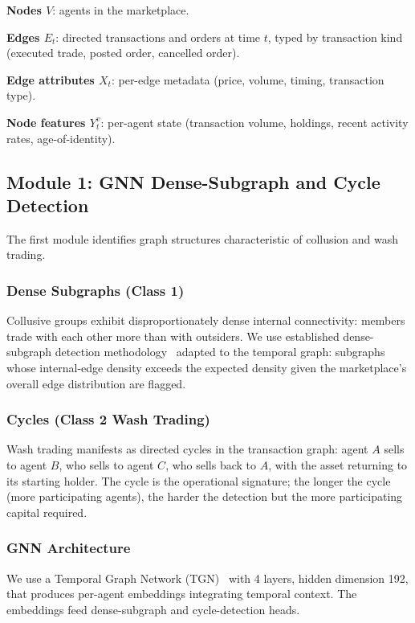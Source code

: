 \documentclass[sigconf,nonacm]{acmart}
\begin{document}
\textbf{Nodes $V$}: agents in the marketplace.

\textbf{Edges $E_t$}: directed transactions and orders at time $t$,
typed by transaction kind (executed trade, posted order, cancelled
order).

\textbf{Edge attributes $X_t$}: per-edge metadata (price, volume,
timing, transaction type).

\textbf{Node features $Y_t^v$}: per-agent state (transaction
volume, holdings, recent activity rates, age-of-identity).

\subsection{Module 1: GNN Dense-Subgraph and Cycle Detection}

The first module identifies graph structures characteristic of
collusion and wash trading.

\subsubsection{Dense Subgraphs (Class 1)}

Collusive groups exhibit disproportionately dense internal
connectivity: members trade with each other more than with
outsiders. We use established dense-subgraph detection
methodology~\cite{semertzidis2024densesubgraph} adapted to the
temporal graph: subgraphs whose internal-edge density exceeds the
expected density given the marketplace's overall edge distribution
are flagged.

\subsubsection{Cycles (Class 2 Wash Trading)}

Wash trading manifests as directed cycles in the transaction graph:
agent $A$ sells to agent $B$, who sells to agent $C$, who sells
back to $A$, with the asset returning to its starting holder.
The cycle is the operational signature; the longer the cycle
(more participating agents), the harder the detection but the
more participating capital required.

\subsubsection{GNN Architecture}

We use a Temporal Graph Network (TGN)~\cite{rossi2020tgn} with 4
layers, hidden dimension 192, that produces per-agent embeddings
integrating temporal context. The embeddings feed dense-subgraph
and cycle-detection heads.
\end{document}
